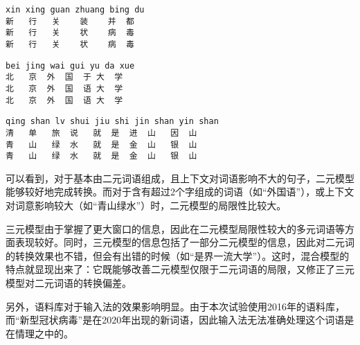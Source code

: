 \documentclass[a4paper]{article}
\begin{document}
\begin{lstlisting}
xin xing guan zhuang bing du
新   行   关    装    并  都
新   行   关    状    病  毒
新   行   关    状    病  毒
\end{lstlisting}

\begin{lstlisting}
bei jing wai gui yu da xue
北   京  外  国  于 大  学
北   京  外  国  语 大  学
北   京  外  国  语 大  学
\end{lstlisting}

\begin{lstlisting}
qing shan lv shui jiu shi jin shan yin shan
清   单   旅  说   就  是  进  山   因  山
青   山   绿  水   就  是  金  山   银  山
青   山   绿  水   就  是  金  山   银  山
\end{lstlisting}

可以看到，对于基本由二元词语组成，且上下文对词语影响不大的句子，二元模型能够较好地完成转换。而对于含有超过2个字组成的词语（如“外国语”），或上下文对词意影响较大（如“青山绿水”）时，二元模型的局限性比较大。

三元模型由于掌握了更大窗口的信息，因此在二元模型局限性较大的多元词语等方面表现较好。同时，三元模型的信息包括了一部分二元模型的信息，因此对二元词的转换效果也不错，但会有出错的时候（如“是界一流大学”）。这时，混合模型的特点就显现出来了：它既能够改善二元模型仅限于二元词语的局限，又修正了三元模型对二元词语的转换偏差。

另外，语料库对于输入法的效果影响明显。由于本次试验使用2016年的语料库，而“新型冠状病毒”是在2020年出现的新词语，因此输入法无法准确处理这个词语是在情理之中的。
\end{document}
